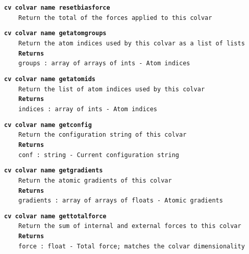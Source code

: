\begin{mdexampleinput}{}
\texttt{\textbf{cv colvar name resetbiasforce}}
\\
\-~~~~\texttt{Return the total of the forces applied to this colvar}
\end{mdexampleinput}
\begin{mdexampleinput}{}
\texttt{\textbf{cv colvar name getatomgroups}}
\\
\-~~~~\texttt{Return the atom indices used by this colvar as a list of lists}
\\
\-~~~~\texttt{\textbf{Returns}}
\\
\-~~~~\texttt{groups : array of arrays of ints - Atom indices}
\end{mdexampleinput}
\begin{mdexampleinput}{}
\texttt{\textbf{cv colvar name getatomids}}
\\
\-~~~~\texttt{Return the list of atom indices used by this colvar}
\\
\-~~~~\texttt{\textbf{Returns}}
\\
\-~~~~\texttt{indices : array of ints - Atom indices}
\end{mdexampleinput}
\begin{mdexampleinput}{}
\texttt{\textbf{cv colvar name getconfig}}
\\
\-~~~~\texttt{Return the configuration string of this colvar}
\\
\-~~~~\texttt{\textbf{Returns}}
\\
\-~~~~\texttt{conf : string - Current configuration string}
\end{mdexampleinput}
\begin{mdexampleinput}{}
\texttt{\textbf{cv colvar name getgradients}}
\\
\-~~~~\texttt{Return the atomic gradients of this colvar}
\\
\-~~~~\texttt{\textbf{Returns}}
\\
\-~~~~\texttt{gradients : array of arrays of floats - Atomic gradients}
\end{mdexampleinput}
\begin{mdexampleinput}{}
\texttt{\textbf{cv colvar name gettotalforce}}
\\
\-~~~~\texttt{Return the sum of internal and external forces to this colvar}
\\
\-~~~~\texttt{\textbf{Returns}}
\\
\-~~~~\texttt{force : float - Total force; matches the colvar dimensionality}
\end{mdexampleinput}
